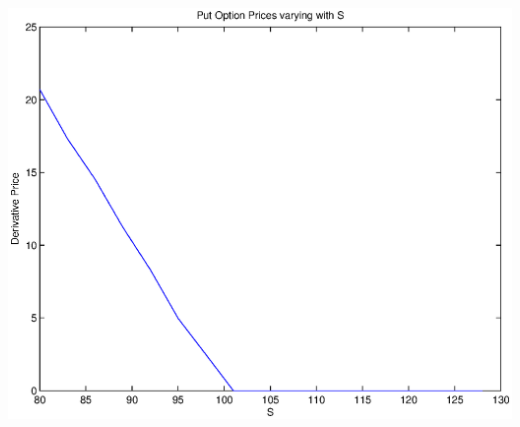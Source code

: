 \documentclass{article}
\begin{document}
\includegraphics[width=\textwidth]{Put_Option_Prices_varying_with_S}
\end{document}
